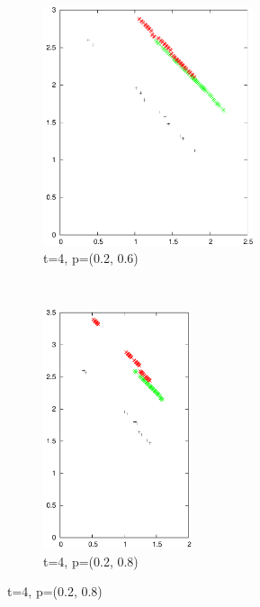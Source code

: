 \documentclass{article}
\begin{document}
\begin{figure}
		\begin{subfigure}[b]{0.45\textwidth}
			\centering
			\includegraphics[width=\textwidth,height=7cm,keepaspectratio]{images/t4_26}
			\caption{t=4, p=(0.2, 0.6)}
			\label{fig:t4_26}
		\end{subfigure}
		~
		\begin{subfigure}[b]{0.45\textwidth}
			\centering
			\includegraphics[width=\textwidth,height=7cm,keepaspectratio]{images/t4_28}
			\caption{t=4, p=(0.2, 0.8)}
			\label{fig:t4_28}
		\end{subfigure}


\end{figure}
\end{document}
